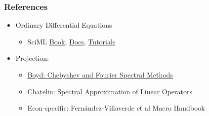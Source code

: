 \documentclass[bigger,handout]{beamer}
\begin{document}
\begin{frame}%
  
\frametitle{References}

\begin{itemize}
\item Ordinary Differential Equations
\begin{itemize}
\item SciML \href{https://book.sciml.ai/}{Book}, \href{https://docs.sciml.a}{Docs}, \href{https://github.com/SciML/SciMLTutorials.jl}{Tutorials} 
\end{itemize}
\item Projection:
\begin{itemize}
\item \href{https://depts.washington.edu/ph506/Boyd.pdf}{Boyd: Chebyshev and Fourier Spectral Methods}
\item \href{https://epubs.siam.org/doi/book/10.1137/1.9781611970678}{Chatelin: Spectral Approximation of Linear Operators}
\item Econ-specific: Fern\'{a}ndez-Villaverde et al Macro Handbook
\end{itemize}
\end{itemize}


\end{frame}%
  
\end{document}
